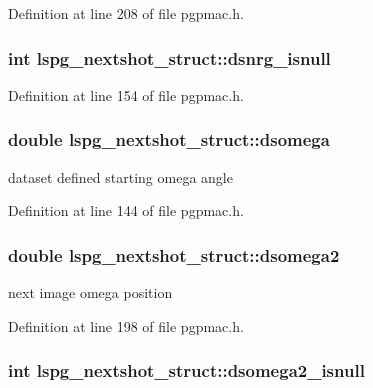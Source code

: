 Definition at line 208 of file pgpmac.h.\hypertarget{structlspg__nextshot__struct_ad14d8bb50290ec12e58f4aaec5cc5aab}{
\subsubsection[{dsnrg\_\-isnull}]{\setlength{\rightskip}{0pt plus 5cm}int {\bf lspg\_\-nextshot\_\-struct::dsnrg\_\-isnull}}}
\label{structlspg__nextshot__struct_ad14d8bb50290ec12e58f4aaec5cc5aab}


Definition at line 154 of file pgpmac.h.\hypertarget{structlspg__nextshot__struct_a4be525bb32fb0232c21a91529f1e8c73}{
\subsubsection[{dsomega}]{\setlength{\rightskip}{0pt plus 5cm}double {\bf lspg\_\-nextshot\_\-struct::dsomega}}}
\label{structlspg__nextshot__struct_a4be525bb32fb0232c21a91529f1e8c73}


dataset defined starting omega angle 

Definition at line 144 of file pgpmac.h.\hypertarget{structlspg__nextshot__struct_a84ae35abfa725d1bdbff5403f6384ee4}{
\subsubsection[{dsomega2}]{\setlength{\rightskip}{0pt plus 5cm}double {\bf lspg\_\-nextshot\_\-struct::dsomega2}}}
\label{structlspg__nextshot__struct_a84ae35abfa725d1bdbff5403f6384ee4}


next image omega position 

Definition at line 198 of file pgpmac.h.\hypertarget{structlspg__nextshot__struct_afaf9bdf89a68e7f479969072643e55eb}{
\subsubsection[{dsomega2\_\-isnull}]{\setlength{\rightskip}{0pt plus 5cm}int {\bf lspg\_\-nextshot\_\-struct::dsomega2\_\-isnull}}}
\label{structlspg__nextshot__struct_afaf9bdf89a68e7f479969072643e55eb}


